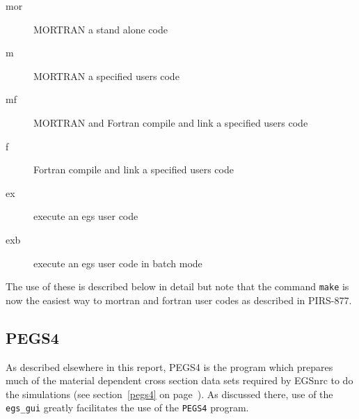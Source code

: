      
  
\begin{description} 
\item[mor]	MORTRAN a stand alone code
\item[m]	MORTRAN a specified users code
\item[mf]	MORTRAN and Fortran compile and link a specified users code
\item[f]	Fortran compile and link a specified users code
\item[ex]	execute an egs user code
\item[exb]	execute an egs user code in batch mode
\end{description} 
The use of these is described below in detail but note that the command
{\tt make} is now the easiest way to mortran and fortran user codes as
described in PIRS-877\cite{Ka03}.




\newpage
\subsection{PEGS4}
\label{pegs4_sc}

As described elsewhere in this report, PEGS4 is the program which
prepares much of the material dependent cross section data sets required 
by EGSnrc to do the simulations (see section~\ref{pegs4} on
page~\pageref{pegs4}).  As discussed there, use of the {\tt egs\_gui}
greatly facilitates the use of the {\tt PEGS4} program.


